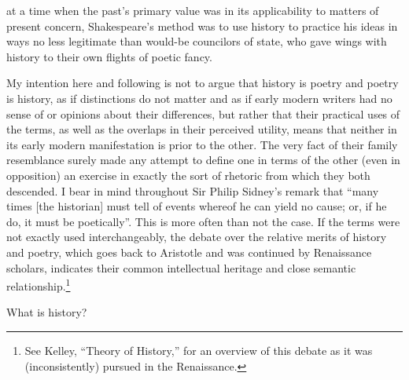 at a time when the past's primary value was in its applicability to matters of present concern, Shakespeare's method was to use history to practice his ideas in ways no less legitimate than would-be councilors of state, who gave wings with history to their own flights of poetic fancy.

My intention here and following is not to argue that history is poetry and poetry is history, as if distinctions do not matter and as if early modern writers had no sense of or opinions about their differences, but rather that their practical uses of the terms, as well as the overlaps in their perceived utility, means that neither in its early modern manifestation is prior to the other. The very fact of their family resemblance surely made any attempt to define one in terms of the other (even in opposition) an exercise in exactly the sort of rhetoric from which they both descended. I bear in mind throughout Sir Philip Sidney's remark that ``many times [the historian] must tell of events whereof he can yield no cause; or, if he do, it must be poetically''\cite[36]{sidney_defence_1966}. This is more often than not the case. If the terms were not exactly used interchangeably, the debate over the relative merits of history and poetry, which goes back to Aristotle and was continued by Renaissance scholars, indicates their common intellectual heritage and close semantic relationship.\footnote{See Kelley, ``Theory of History,'' for an overview of this debate as it was (inconsistently) pursued in the Renaissance.\nocite{kelley_theory_1988}}

What is history?

